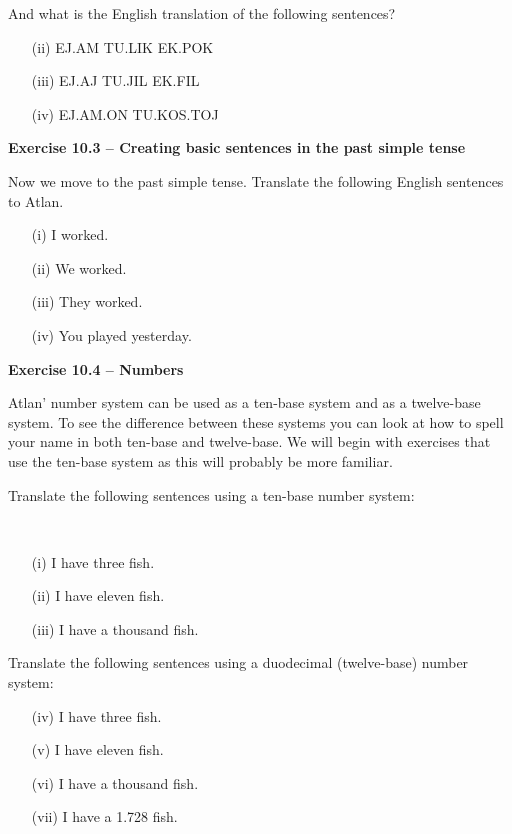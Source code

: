 \noindent And what is the English translation of the following sentences? 
\begin{itemize}
    \item[(ii)] EJ.AM TU.LIK EK.POK \ej\am \tu\lik \ek\pok  

    \item[(iii)] EJ.AJ TU.JIL EK.FIL\ej\aj \tu\jil \ek\fil  

    \item[(iv)] EJ.AM.ON TU.KOS.TOJ \ej\am\on \tu\kos\toj 
\end{itemize}

\noindent \textbf{Exercise 10.3 -- Creating basic sentences in the past simple tense} 

Now we move to the past simple tense. Translate the following English sentences to Atlan. 
\begin{itemize}
    \item[(i)]I worked. 

    \item[(ii)]We worked. 

    \item[(iii)]They worked. 

    \item[(iv)]You played yesterday. 
\end{itemize}
 

\noindent \textbf{Exercise 10.4 -- Numbers} 

Atlan’ number system can be used as a ten-base system and as a twelve-base system. To see the difference between these systems you can look at how to spell your name in both ten-base and twelve-base. We will begin with exercises that use the ten-base system as this will probably be more familiar. 

\noindent Translate the following sentences using a ten-base number system:

\phantom{.}\\

\begin{itemize}
    \item[(i)]I have three fish. 

    \item[(ii)]I have eleven fish. 

    \item[(iii)]I have a thousand fish. 
\end{itemize}
\noindent Translate the following sentences using a duodecimal (twelve-base) number system:
\begin{itemize}
    \item[(iv)]I have three fish. 

    \item[(v)]I have eleven fish. 

    \item[(vi)]I have a thousand fish. 

    \item[(vii)]I have a 1.728 fish.  
\end{itemize}
 

